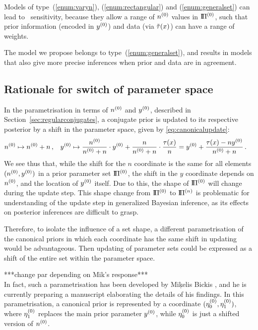 Models of type~(\ref{enum:varyn}), (\ref{enum:rectangular}) and (\ref{enum:generalset}) can lead to \pdc\ sensitivity,
because they allow a range of $n^{(0)}$ values in $\text{I}\!\Pi^{(0)}$,
such that prior information (encoded in $y^{(0)}$) and data (via $\tilde{\tau}(x)$) can have a range of weights.

The model we propose belongs to type~(\ref{enum:generalset}),
and results in models that also give more precise inferences when prior and data are in agreement.



\subsection{Rationale for switch of parameter space}

In the parametrisation in terms of $n^{(0)}$ and $y^{(0)}$, described in Section~\ref{sec:regularconjugates},
a conjugate prior is updated to its respective posterior by a shift in the parameter space,
given by \eqref{eq:canonicalupdate}:
\begin{align*}
n^{(0)} &\mapsto n^{(0)} + n\,, &
y^{(0)} &\mapsto \frac{n^{(0)}}{n^{(0)} + n} \cdot y^{(0)} + \frac{n}{n^{(0)} + n} \cdot \frac{\tau(x)}{n} = y^{(0)} + \frac{\tau(x)-ny^{(0)}}{n^{(0)}+n}\,.
\end{align*}
We see thus that, while the shift for the $n$ coordinate is the same for all elements $(n^{(0)},y^{(0)})$
in a prior parameter set $\text{I}\!\Pi^{(0)}$,
the shift in the $y$ coordinate depends on $n^{(0)}$, and the location of $y^{(0)}$ itself.
Due to this, the shape of $\text{I}\!\Pi^{(0)}$ will change during the update step.
This shape change from $\text{I}\!\Pi^{(0)}$ to $\text{I}\!\Pi^{(n)}$ is problematic for understanding of the update step in generalized Bayesian inference,
as its effects on posterior inferences are difficult to grasp.

Therefore, to isolate the influence of a set shape,
a different parametrisation of the canonical priors
in which each coordinate has the same shift in updating
would be advantageous.
Then updating of parameter sets
could be expressed as a shift of the entire set within the parameter space.

***change par depending on Mik's response***\\
In fact, such a parametrisation has been developed by Mi\c{k}elis Bickis \cite[personal communication]{2011:bickis:geomip},
and he is currently preparing a manuscript elaborating the details of his findings.
In this parametrisation, a canonical prior is represented by a coordinate $(\eta_0^{(0)},\eta_1^{(0)})$,
where $\eta_1^{(0)}$ replaces the main prior parameter $y^{(0)}$,
while $\eta_0^{(0)}$ is just a shifted version of $n^{(0)}$.%


